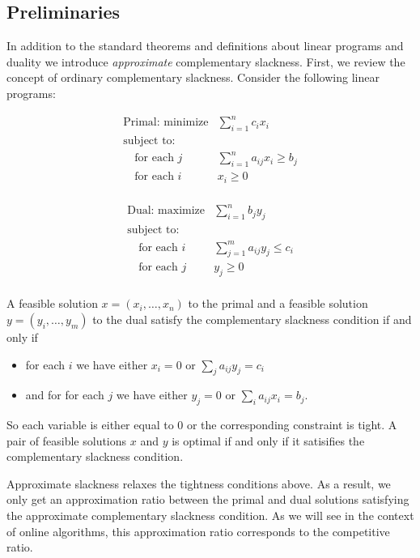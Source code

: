 \subsection{Preliminaries}
In addition to the standard theorems and definitions about linear programs and duality we introduce \emph{approximate} complementary slackness.
First, we review the concept of ordinary complementary slackness.
Consider the following linear programs:

\[
\begin{array}{lr}
  \textrm{Primal: minimize}   & \sum^n_{i=1} c_i x_i  \\
  \textrm{subject to:} & \\
  \quad \textrm{for each $j$} & \sum_{i=1}^n a_{ij} x_i \geq b_j \\
  \quad \textrm{for each $i$} & x_i \geq 0 \\
\end{array}
\]

\[
\begin{array}{lr}
  \textrm{Dual: maximize}   & \sum^n_{i=1} b_j y_j  \\
  \textrm{subject to:} & \\
  \quad \textrm{for each $i$} & \sum_{j=1}^m a_{ij} y_j \leq c_i \\
  \quad \textrm{for each $j$} & y_j \geq 0 \\
\end{array}
\]

A feasible solution $x = (x_i, \ldots, x_n)$ to the primal and a feasible solution $y = (y_i, \ldots, y_m)$ to the dual satisfy the complementary slackness condition if and only if
\begin{itemize}
\item for each $i$ we have either $x_i = 0$ or $\sum_{j} a_{ij}y_j = c_i$
\item and for for each $j$ we have either $y_j = 0$ or $\sum_{i} a_{ij} x_i = b_j$.
\end{itemize}
So each variable is either equal to 0 or the corresponding constraint is tight.
A pair of feasible solutions $x$ and $y$ is optimal if and only if it satisifies the complementary slackness condition.

Approximate slackness relaxes the tightness conditions above.
As a result, we only get an approximation ratio between the primal and dual solutions satisfying the approximate complementary slackness condition.
As we will see in the context of online algorithms, this approximation ratio corresponds to the competitive ratio.

